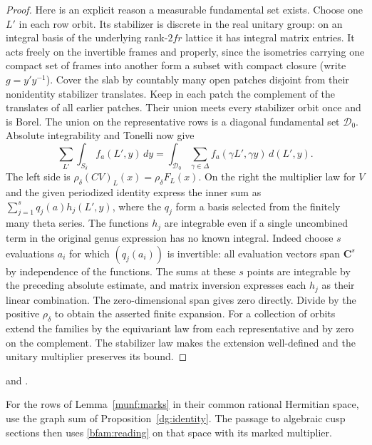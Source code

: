 \begin{proof}
Here is an explicit reason a measurable fundamental set exists.
Choose one \(L'\) in each row orbit. Its stabilizer is discrete in
the real unitary group: on an integral basis of the underlying
rank-\(2fr\) lattice it has integral matrix entries. It acts freely
on the invertible frames and properly, since the isometries carrying
one compact set of frames into another form a subset with compact
closure (write \(g=y'y^{-1}\)). Cover the slab by countably many
open patches disjoint from their nonidentity stabilizer translates.
Keep in each patch the complement of the translates of all earlier
patches. Their union meets every stabilizer orbit once and is Borel.
The union on the representative rows is a diagonal fundamental set
\(\mathcal D_0\). Absolute integrability and Tonelli now give
\[
 \sum_{L'}\int_{S_\delta}f_a(L',y)\,dy
       =\int_{\mathcal D_0}\sum_{\gamma\in\Delta}
                           f_a(\gamma L',\gamma y)\,d(L',y).
\]
The left side is \(\rho_\delta(CV)_L(x)=\rho_\delta F_L(x)\).
On the right the multiplier law for \(V\) and the given periodized
identity express the inner sum as \(\sum_{j=1}^s q_j(a)h_j(L',y)\),
where the \(q_j\) form a basis selected from the finitely many theta
series. The functions \(h_j\) are integrable even if a single
uncombined term in the original genus expression has no known
integral. Indeed choose \(s\) evaluations \(a_i\) for which
\((q_j(a_i))\) is invertible: all evaluation vectors span
\(\mathbf C^s\) by independence of the functions. The sums at these
\(s\) points are integrable by the preceding absolute estimate, and
matrix inversion expresses each \(h_j\) as their linear combination.
The zero-dimensional span gives zero directly. Divide by the
positive \(\rho_\delta\) to obtain the asserted finite expansion.
For a collection of orbits extend the families by the equivariant
law from each representative and by zero on the complement. The
stabilizer law makes the extension well-defined and the unitary
multiplier preserves its bound.
\end{proof}
 and
.

For the rows of Lemma~\ref{munf:marks} in their common rational
Hermitian space, use the graph sum of Proposition~\ref{dg:identity}.
The passage to algebraic cusp sections then uses \eqref{bfam:reading}
on that space with its marked multiplier.

